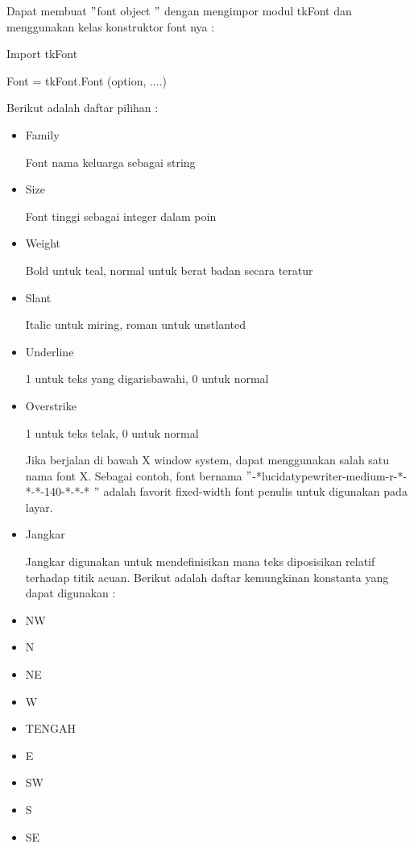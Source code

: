 \documentclass [12pt,a4paper,notitlepage,oneside,bahasa]{article}
\begin{document}
 \par
\vspace{12pt}
Dapat membuat  $ " $font object $ " $ dengan mengimpor modul tkFont dan menggunakan kelas konstruktor font nya : \par
Import tkFont \par
Font = tkFont.Font (option, ....) \par
\vspace{12pt}
Berikut adalah daftar pilihan : \par
\noindent 
\begin{itemize}
\item Family \par
Font nama keluarga sebagai string \par
\noindent 
\item Size \par
Font tinggi sebagai integer dalam poin \par
\noindent 
\item Weight \par
Bold untuk teal, normal untuk berat badan secara teratur \par
\noindent 
\item Slant \par
Italic untuk miring, roman untuk unstlanted \par
\noindent 
\item Underline \par
1 untuk teks yang digarisbawahi, 0 untuk normal \par
\noindent 
\item Overstrike \par
1 untuk teks telak, 0 untuk normal \par
Jika berjalan di bawah X window system, dapat menggunakan salah satu nama font X. Sebagai contoh, font bernama  $ " $-*lucidatypewriter-medium-r-*-*-*-140-*-*-* $ " $ adalah favorit fixed-width font penulis untuk digunakan pada layar. \par
\noindent 
\item Jangkar \par
\noindent 
Jangkar digunakan untuk mendefinisikan mana teks diposisikan relatif terhadap titik acuan. Berikut adalah daftar kemungkinan konstanta yang dapat digunakan : \par
\noindent 
\item NW \par
\noindent 
\item N \par
\noindent 
\item NE \par
\noindent 
\item W \par
\noindent 
\item TENGAH \par
\noindent 
\item E \par
\noindent 
\item SW \par
\noindent 
\item S \par
\noindent 
\item SE\end{itemize}
\end{document}
